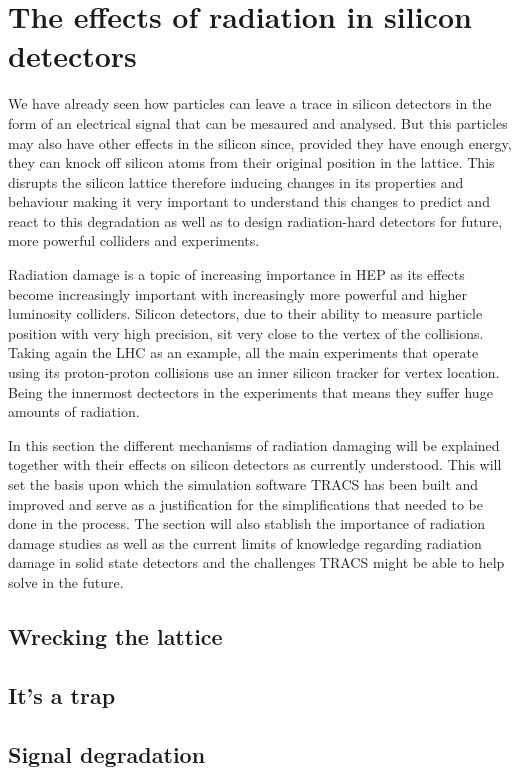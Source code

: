 \chapter{The effects of radiation in silicon detectors}

We have already seen how particles can leave a trace in silicon detectors in the form of an electrical signal that can be mesaured and analysed. But this particles may also have other effects in the silicon since, provided they have enough energy, they can knock off silicon atoms from their original position in the lattice. This disrupts the silicon lattice therefore inducing changes in its properties and behaviour making it very important to understand this changes to predict and react to this degradation as well as to design radiation-hard detectors for future, more powerful colliders and experiments. 

Radiation damage is a topic of increasing importance in HEP as its effects become increasingly important with increasingly more powerful and higher luminosity colliders. Silicon detectors, due to their ability to measure particle position with very high precision, sit very close to the vertex of the collisions. Taking again the LHC as an example, all the main experiments that operate using its proton-proton collisions use an inner silicon tracker for vertex location. Being the innermost dectectors in the experiments that means they suffer huge amounts of radiation. 

In this section the different mechanisms of radiation damaging will be explained together with their effects on silicon detectors as currently understood. This will set the basis upon which the simulation software TRACS has been built and improved and serve as a justification for the simplifications that needed to be done in the process. The section will also stablish the importance of radiation damage studies as well as the current limits of knowledge regarding radiation damage in solid state detectors and the challenges TRACS might be able to help solve in the future.


\section{Wrecking the lattice}

\section{It's a trap}

\section{Signal degradation}
